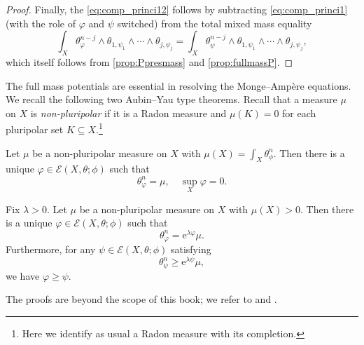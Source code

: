 \begin{proof}
    Finally, the \eqref{eq:comp_princi12} follows by subtracting \eqref{eq:comp_princi1} (with the role of $\varphi$ and $\psi$ switched) from the total mixed mass equality
    \[
        \int_X\theta_\varphi^{n-j}\wedge \theta_{1,\psi_1}\wedge\cdots\wedge\theta_{j,\psi_j}= \int_X\theta_\psi^{n-j}\wedge \theta_{1,\psi_1}\wedge\cdots\wedge\theta_{j,\psi_j},
    \]
    which itself follows from \cref{prop:Ppresmass} and \cref{prop:fullmassP}.
\end{proof}

The full mass potentials are essential in resolving the Monge--Ampère equations. We recall the following two Aubin--Yau type theorems. Recall that a measure $\mu$ on $X$ is \emph{non-pluripolar} if it is a Radon measure and $\mu(K)=0$ for each pluripolar set $K\subseteq X$.\footnote{Here we identify as usual a Radon measure with its completion.}
\begin{theorem}\label{thm:Yau_rel}
    Let $\mu$ be a non-pluripolar measure on $X$ with $\mu(X)=\int_X \theta_{\phi}^n$. Then there is a unique $\varphi\in \mathcal{E}(X,\theta;\phi)$ such that
    \[
    \theta_{\varphi}^n=\mu,\quad \sup_X \varphi=0.
    \]
\end{theorem}


\begin{theorem}\label{thm:AY_rel}
    Fix $\lambda>0$. Let $\mu$ be a non-pluripolar measure on $X$ with $\mu(X)>0$. Then there is a unique $\varphi\in \mathcal{E}(X,\theta;\phi)$ such that
    \[
    \theta_{\varphi}^n=\mathrm{e}^{\lambda\varphi}\mu.
    \]
    Furthermore, for any $\psi\in \mathcal{E}(X,\theta;\phi)$ satisfying
    \[
    \theta_{\psi}^n\geq \mathrm{e}^{\lambda\psi}\mu,
    \]
    we have $\varphi\geq \psi$.
\end{theorem}
The proofs are beyond the scope of this book; we refer to \cite{DDNL19log} and \cite[Proposition~17.4.6 and Theorems~17.4.11, 17.4.13--17.4.14]{FPT}.


